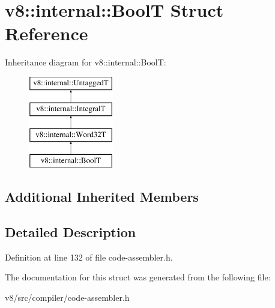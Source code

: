 \hypertarget{structv8_1_1internal_1_1BoolT}{}\section{v8\+:\+:internal\+:\+:BoolT Struct Reference}
\label{structv8_1_1internal_1_1BoolT}
Inheritance diagram for v8\+:\+:internal\+:\+:BoolT\+:\begin{figure}[H]
\begin{center}
\leavevmode
\includegraphics[height=4.000000cm]{structv8_1_1internal_1_1BoolT}
\end{center}
\end{figure}
\subsection*{Additional Inherited Members}


\subsection{Detailed Description}


Definition at line 132 of file code-\/assembler.\+h.



The documentation for this struct was generated from the following file\+:\begin{DoxyCompactItemize}
\item 
v8/src/compiler/code-\/assembler.\+h\end{DoxyCompactItemize}
